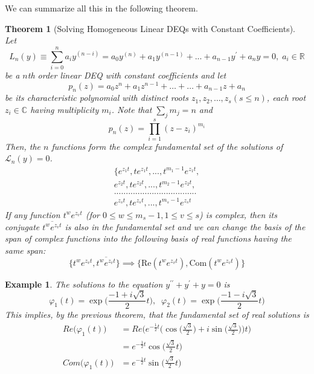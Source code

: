 \documentclass{article}
\newtheorem{theorem}{Theorem}[section]
\newtheorem{example}{Example}[section]
\theoremstyle{remark}
\theoremstyle{definition}
\begin{document}
      We can summarize all this in the following theorem. 

      \begin{theorem}[Solving Homogeneous Linear DEQs with Constant Coefficients]
      Let
      \[L_n (y) \equiv \sum_{i=0}^n a_i y^{(n-i)} = a_0 y^{(n)} + a_1 y^{(n-1)} + ... + a_{n-1} y^\prime + a_n y = 0, \; a_i \in \mathbb{R} \]
      be a $n$th order linear DEQ with constant coefficients and let
      \[p_n (z) = a_0 z^n + a_1 z^{n-1} + \ldots + \ldots + a_{n-1} z + a_n\]
      be its characteristic polynomial with distinct roots $z_1, z_2, \ldots, z_s (s \leq n)$, each root $z_i \in \mathbb{C}$ having multiplicity $m_i$. Note that $\sum_j m_j = n$ and 
      \[p_n (z) = \prod_{i=1}^s (z - z_i)^{m_i}\]
      Then, the $n$ functions form the complex fundamental set of the solutions of $\mathcal{L}_n (y) = 0$. 
      \begin{align*}
          \{ e^{z_1 t}, t e^{z_1 t}, ..., t^{m_1 - 1} e^{z_1 t},  \\
          e^{z_2 t}, t e^{z_2 t}, ..., t^{m_2 - 1} e^{z_2 t}, \\
          ................................... \\
          e^{z_s t}, t e^{z_s t}, ..., t^{m_s - 1} e^{z_s t}
      \end{align*}
      If any function $t^w e^{z_v t}$ (for $0 \leq w \leq m_s - 1, 1 \leq v \leq s$) is complex, then its conjugate $\overline{t^w e^{z_v t}}$ is also in the fundamental set and we can change the basis of the span of complex functions into the following basis of real functions having the same span:
      \[\{t^w e^{z_v t}, \overline{t^w e^{z_v t}}\} \implies \{\text{Re}(t^w e^{z_v t}), \text{Com}(t^w e^{z_v t})\}\]
      \end{theorem}

      \begin{example}
      The solutions to the equation $y^{\prime \prime} + y^\prime + y = 0$ is 
      \[\varphi_1 (t) = \exp \Big(\frac{-1+i\sqrt{3}}{2} t \Big), \;\; \varphi_2 (t) = \exp \Big( \frac{-1 - i \sqrt{3}}{2} t\Big) \]
      This implies, by the previous theorem, that the fundamental set of real solutions is
      \begin{align*}
          Re \big(\varphi_1 (t)\big) & = Re \bigg( e^{-\frac{1}{2} t} \Big( \cos{\Big(\frac{\sqrt{3}}{2}\Big)} + i \sin{\Big(\frac{\sqrt{3}}{2}\Big)}\Big) t\bigg) \\
          & = e^{-\frac{1}{2} t} \cos{\Big(\frac{\sqrt{3}}{2} t\Big)}  \\
          Com \big(\varphi_1 (t)\big) & = e^{-\frac{1}{2} t} \sin{\Big(\frac{\sqrt{3}}{2} t\Big)} 
      \end{align*}
      \end{example}
\end{document}
